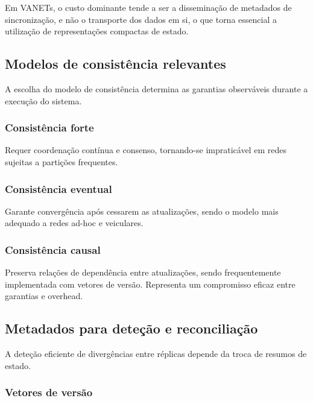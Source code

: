 Em \gls{VANETs}, o custo dominante tende a ser a disseminação de metadados de sincronização, e não o transporte dos dados em si, o que torna essencial a utilização de representações compactas de estado.

\subsection{Modelos de consistência relevantes}
\label{sub:modelos_consistencia}

A escolha do modelo de consistência determina as garantias observáveis durante a execução do sistema.

\subsubsection*{Consistência forte}

Requer coordenação contínua e consenso, tornando-se impraticável em redes sujeitas a partições frequentes.

\subsubsection*{Consistência eventual}

Garante convergência após cessarem as atualizações, sendo o modelo mais adequado a redes ad-hoc e veiculares.

\subsubsection*{Consistência causal}

Preserva relações de dependência entre atualizações, sendo frequentemente implementada com vetores de versão. Representa um compromisso eficaz entre garantias e overhead.

\subsection{Metadados para deteção e reconciliação}
\label{sub:metadados_sync}

A deteção eficiente de divergências entre réplicas depende da troca de resumos de estado.

\subsubsection*{Vetores de versão}

